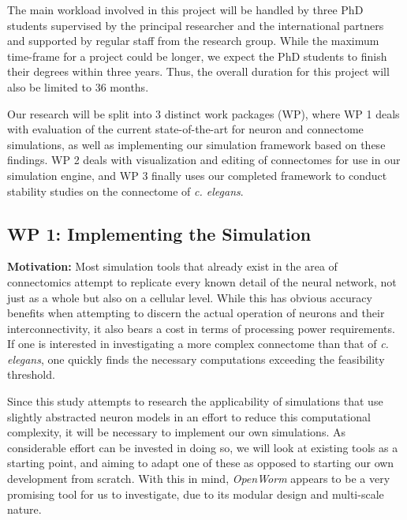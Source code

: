 \documentclass[a4paper,11pt]{article}
\begin{document}
The main workload involved in this project will be handled by three PhD students
supervised by the principal researcher and the international partners and supported by regular staff from the research group.
While the maximum time-frame for a project could be longer, we expect the PhD students to finish their degrees within three years. Thus, the overall duration for this project will also be limited to 36 months.

Our research will be split into 3 distinct work packages (WP), where WP 1 deals with evaluation of the current state-of-the-art for neuron and connectome simulations, as well as implementing our simulation framework based on these findings. WP 2 deals with visualization and editing of connectomes for use in our simulation engine, and WP 3 finally uses our completed framework to conduct stability studies on the connectome of \emph{c. elegans}.


\subsection{WP 1: Implementing the Simulation}

\textbf{Motivation:}
Most simulation tools that already exist in the area of connectomics attempt to replicate every known detail of the neural network, not just as a whole but also on a cellular level. While this has obvious accuracy benefits when attempting to discern the actual operation of neurons and their interconnectivity, it also bears a cost in terms of processing power requirements. If one is interested in investigating a more complex connectome than that of \emph{c. elegans}, one quickly finds the necessary computations exceeding the feasibility threshold.

Since this study attempts to research the applicability of simulations that use slightly abstracted neuron models in an effort to reduce this computational complexity, it will be necessary to implement our own simulations. As considerable effort can be invested in doing so, we will look at existing tools as a starting point, and aiming to adapt one of these as opposed to starting our own development from scratch. With this in mind, \emph{OpenWorm} \citep{Szigeti2014} appears to be a very promising tool for us to investigate, due to its modular design and multi-scale nature.
\end{document}
